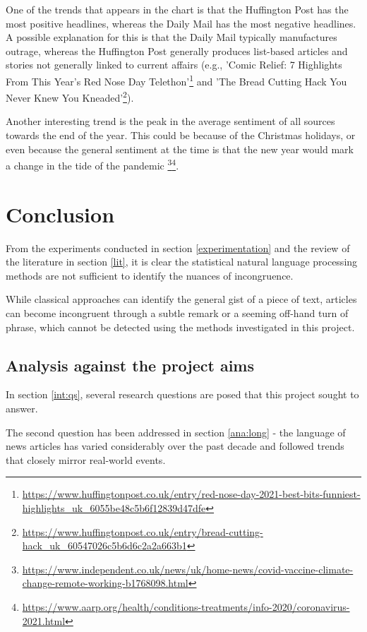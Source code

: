 One of the trends that appears in the chart is that the Huffington Post has the most positive headlines, whereas the Daily Mail has the most negative headlines. A possible explanation for this is that the Daily Mail typically manufactures outrage, whereas the Huffington Post generally produces list-based articles and stories not generally linked to current affairs (e.g., 'Comic Relief: 7 Highlights From This Year's Red Nose Day Telethon'\footnote{\url{https://www.huffingtonpost.co.uk/entry/red-nose-day-2021-best-bits-funniest-highlights_uk_6055be48c5b6f12839d47dfe}} and 'The Bread Cutting Hack You Never Knew You Kneaded'\footnote{\url{https://www.huffingtonpost.co.uk/entry/bread-cutting-hack_uk_60547026c5b6d6c2a2a663b1}}). 

Another interesting trend is the peak in the average sentiment of all sources towards the end of the year. This could be because of the Christmas holidays, or even because the general sentiment at the time is that the new year would mark a change in the tide of the pandemic \footnote{\url{https://www.independent.co.uk/news/uk/home-news/covid-vaccine-climate-change-remote-working-b1768098.html}}\footnote{\url{https://www.aarp.org/health/conditions-treatments/info-2020/coronavirus-2021.html}}.

\section{Conclusion}

From the experiments conducted in section \ref{experimentation} and the review of the literature in section \ref{lit}, it is clear the statistical natural language processing methods are not sufficient to identify the nuances of incongruence. 

While classical approaches can identify the general gist of a piece of text, articles can become incongruent through a subtle remark or a seeming off-hand turn of phrase, which cannot be detected using the methods investigated in this project. 

\subsection{Analysis against the project aims}

In section \ref{int:qs}, several research questions are posed that this project sought to answer.

The second question has been addressed in section \ref{ana:long} - the language of news articles has varied considerably over the past decade and followed trends that closely mirror real-world events.

